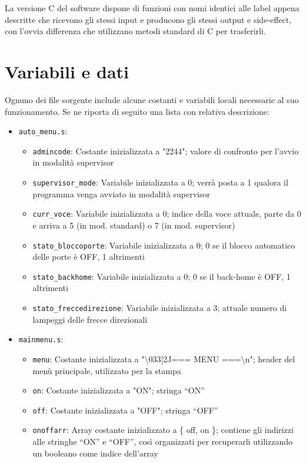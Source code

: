\documentclass[
  12pt,
  a4paper,
  headings=optiontoheadandtoc
]{scrreprt}
\begin{document}
La versione C del software dispone di funzioni con nomi identici alle label appena descritte che ricevono gli stessi input e producono gli stessi output e side-effect, con l'ovvia differenza che utilizzano metodi standard di C per trasferirli.

\section[nonumber=true]{Variabili e dati}

Ognuno dei file sorgente include alcune costanti e variabili locali necessarie al suo funzionamento. Se ne riporta di seguito una lista con relativa descrizione:

\begin{itemize}
\item \texttt{auto\_menu.s}:
  \begin{itemize}
    \item \texttt{admincode}: Costante inizializzata a "2244"; valore di confronto per l'avvio in modalità supervisor
    \item \texttt{supervisor\_mode}: Variabile inizializzata a 0; verrà posta a 1 qualora il programma venga avviato in modalità supervisor
    \item \texttt{curr\_voce}: Variabile inizializzata a 0; indice della voce attuale, parte da 0 e arriva a 5 (in mod. standard) o 7 (in mod. supervisor)
    \item \texttt{stato\_bloccoporte}: Variabile inizializzata a 0; 0 se il blocco automatico delle porte è OFF, 1 altrimenti
    \item \texttt{stato\_backhome}: Variabile inizializzata a 0; 0 se il back-home è OFF, 1 altrimenti
    \item \texttt{stato\_freccedirezione}: Variabile inizializzata a 3; attuale numero di lampeggi delle frecce direzionali
  \end{itemize}
\item \texttt{mainmenu.s}:
  \begin{itemize}
    \item \texttt{menu}: Costante inizializzata a "\textbackslash033[2J=== MENU ===\textbackslash{}n"; header del menù principale, utilizzato per la stampa
    \item \texttt{on}: Costante inizializzata a "ON"; stringa ``ON''
    \item \texttt{off}: Costante inizializzata a "OFF"; stringa ``OFF''
    \item \texttt{onoffarr}: Array costante inizializzato a \{ off, on \}; contiene gli indirizzi alle stringhe ``ON'' e ``OFF'', così organizzati per recuperarli utilizzando un booleano come indice dell'array

\end{itemize}
\end{itemize}
\end{document}
